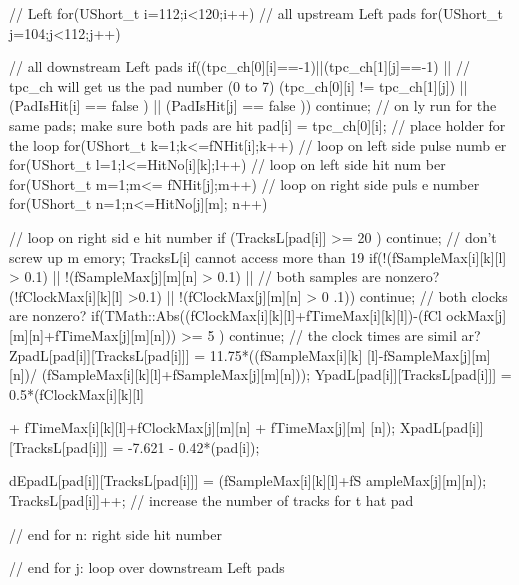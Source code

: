 \begin{DoxyCode}
{{{{{{{{{{          // Left
          for(UShort_t i=112;i<120;i++) // all upstream Left pads
            for(UShort_t j=104;j<112;j++){ // all downstream Left pads
              if((tpc_ch[0][i]==-1)||(tpc_ch[1][j]==-1) || // tpc_ch will get us 
      the pad number (0 to 7)
              (tpc_ch[0][i] != tpc_ch[1][j]) || 
              (PadIsHit[i] == false ) || (PadIsHit[j] == false )) continue; // on
      ly run for the same pads; make sure both pads are hit
                pad[i] = tpc_ch[0][i]; // place holder for the loop
                for(UShort_t k=1;k<=fNHit[i];k++) // loop on left side pulse numb
      er
                for(UShort_t l=1;l<=HitNo[i][k];l++) // loop on left side hit num
      ber
                    for(UShort_t m=1;m<= fNHit[j];m++) // loop on right side puls
      e number
                      for(UShort_t n=1;n<=HitNo[j][m]; n++){ // loop on right sid
      e hit number
                        if (TracksL[pad[i]] >= 20 ) continue; // don't screw up m
      emory; TracksL[i] cannot access more than 19
                        if(!(fSampleMax[i][k][l] > 0.1) || !(fSampleMax[j][m][n] 
      > 0.1)  || // both samples are nonzero?
                           (!fClockMax[i][k][l] >0.1) || !(fClockMax[j][m][n] > 0
      .1)) continue;  // both clocks are nonzero?
                        if(TMath::Abs((fClockMax[i][k][l]+fTimeMax[i][k][l])-(fCl
      ockMax[j][m][n]+fTimeMax[j][m][n])) >= 5 ) continue; // the clock times are simil
      ar?
                        ZpadL[pad[i]][TracksL[pad[i]]] = 11.75*((fSampleMax[i][k]
      [l]-fSampleMax[j][m][n])/
                          (fSampleMax[i][k][l]+fSampleMax[j][m][n]));
                        YpadL[pad[i]][TracksL[pad[i]]] = 0.5*(fClockMax[i][k][l] 
      
                          + fTimeMax[i][k][l]+fClockMax[j][m][n] + fTimeMax[j][m]
      [n]);
                        XpadL[pad[i]][TracksL[pad[i]]] = -7.621 - 0.42*(pad[i]); 
      
                        dEpadL[pad[i]][TracksL[pad[i]]] = (fSampleMax[i][k][l]+fS
      ampleMax[j][m][n]);
                        TracksL[pad[i]]++; // increase the number of tracks for t
      hat pad
                      } // end for n: right side hit number
            } // end for j: loop over downstream Left pads 
          
}}}}}}}}}}
\end{DoxyCode}
